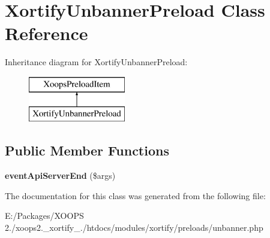 \hypertarget{class_xortify_unbanner_preload}{\section{Xortify\-Unbanner\-Preload Class Reference}
\label{class_xortify_unbanner_preload}
}
Inheritance diagram for Xortify\-Unbanner\-Preload\-:\begin{figure}[H]
\begin{center}
\leavevmode
\includegraphics[height=2.000000cm]{class_xortify_unbanner_preload}
\end{center}
\end{figure}
\subsection*{Public Member Functions}
\begin{DoxyCompactItemize}
\item 
\hypertarget{class_xortify_unbanner_preload_a25419780ba91bd542644be9cd6ce49fd}{{\bfseries event\-Api\-Server\-End} (\$args)}\label{class_xortify_unbanner_preload_a25419780ba91bd542644be9cd6ce49fd}

\end{DoxyCompactItemize}


The documentation for this class was generated from the following file\-:\begin{DoxyCompactItemize}
\item 
E\-:/\-Packages/\-X\-O\-O\-P\-S 2./xoops2.\-\_\-xortify\-\_./htdocs/modules/xortify/preloads/unbanner.\-php\end{DoxyCompactItemize}

